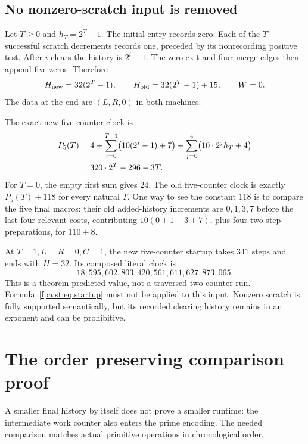 \documentclass[11pt,a4paper]{article}
\numberwithin{equation}{section}
\begin{document}
\subsection{No nonzero-scratch input is removed}
Let $T\geq0$ and $h_T=2^T-1$. The initial entry records zero. Each of the $T$
successful scratch decrements records one, preceded by its nonrecording
positive test. After $i$ clears the history is $2^i-1$. The zero exit and
four merge edges then append five zeros. Therefore
\begin{equation}
 H_{\rm new}=32(2^T-1),\qquad
 H_{\rm old}=32(2^T-1)+15,\qquad W=0.
 \label{fpa:st:eq:allT}
\end{equation}
The data at the end are $(L,R,0)$ in both machines.

The exact new five-counter clock is
\begin{align}
 P_5(T)
 &=4+\sum_{i=0}^{T-1}\bigl(10(2^i-1)+7\bigr)
       +\sum_{j=0}^{4}\bigl(10\cdot2^j h_T+4\bigr)\notag\\
 &=320\cdot2^T-296-3T.
 \label{fpa:st:eq:allTclock}
\end{align}
For $T=0$, the empty first sum gives $24$. The old five-counter clock is
exactly $P_5(T)+118$ for every natural $T$. One way to see the constant
$118$ is to compare the five final macros: their old added-history
increments are $0,1,3,7$ before the last four relevant costs, contributing
$10(0+1+3+7)$, plus four two-step preparations, for $110+8$.

At $T=1,L=R=0,C=1$, the new five-counter startup takes $341$ steps and ends
with $H=32$. Its composed literal clock is
\[
 18{,}595{,}602{,}803{,}420{,}561{,}611{,}627{,}873{,}065.
\]
This is a theorem-predicted value, not a traversed two-counter run.
Formula~\eqref{fpa:st:eq:startup} must not be applied to this input. Nonzero scratch
is fully supported semantically, but its recorded clearing history remains
in an exponent and can be prohibitive.

\section{The order preserving comparison proof}
\label{fpa:st:sec:dominance}
A smaller final history by itself does not prove a smaller runtime: the
intermediate work counter also enters the prime encoding. The needed
comparison matches actual primitive operations in chronological order.
\end{document}
